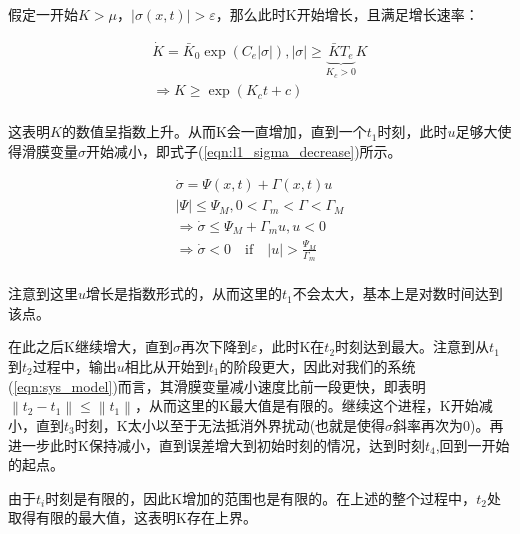 假定一开始$K>\mu$，$\left| \sigma \left( x,t \right) \right|>\varepsilon$，那么此时K开始增长，且满足增长速率：

\begin{equation}
    \begin{array}{c}
        \dot{K}=\bar{K}_0\exp \left( C_e\left| \sigma \right| \right), \left| \sigma \right|\ge \underset{K_c>0}{\underbrace{\bar{K}T_e}}K\\
        \Rightarrow K\ge \exp \left( K_ct+c \right)\\
    \end{array}
    \label{eqn:l1_Kinit}
\end{equation}

这表明$K$的数值呈指数上升。从而K会一直增加，直到一个$t_1$时刻，此时$u$足够大使得滑膜变量$\sigma$开始减小，即式子(\ref{eqn:l1_sigma_decrease})所示。

\begin{equation}
    \begin{array}{c}
        \dot{\sigma}=\varPsi \left( x,t \right) +\varGamma \left( x,t \right) u\\
        \left| \varPsi \right|\le \varPsi _M, 0<\varGamma _m<\varGamma <\varGamma _M\\
        \Rightarrow \dot{\sigma}\le \varPsi _M+\varGamma _mu, u<0\\
        \Rightarrow \dot{\sigma}<0\quad \mathrm{if}\quad \left| u \right|>\frac{\varPsi _M}{\varGamma _m}\\
    \end{array}
    \label{eqn:l1_sigma_decrease}
\end{equation}

注意到这里$u$增长是指数形式的，从而这里的$t_1$不会太大，基本上是对数时间达到该点。

在此之后K继续增大，直到$\sigma$再次下降到$\varepsilon$，此时K在$t_2$时刻达到最大。注意到从$t_1$到$t_2$过程中，输出$u$相比从开始到$t_1$的阶段更大，因此对我们的系统(\ref{eqn:sys_model})而言，其滑膜变量减小速度比前一段更快，即表明$\left\| t_2-t_1 \right\| \le \left\| t_1 \right\| $，从而这里的K最大值是有限的。继续这个进程，K开始减小，直到$t_3$时刻，K太小以至于无法抵消外界扰动(也就是使得$\sigma$斜率再次为0)。再进一步此时K保持减小，直到误差增大到初始时刻的情况，达到时刻$t_4$,回到一开始的起点。

由于$t_i$时刻是有限的，因此K增加的范围也是有限的。在上述的整个过程中，$t_2$处取得有限的最大值，这表明K存在上界。

